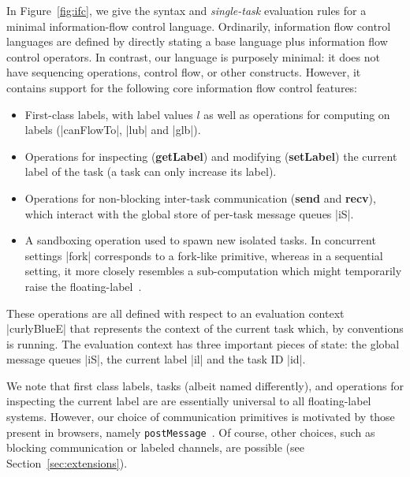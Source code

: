 In Figure~\ref{fig:ifc}, we give the syntax and \emph{single-task}
evaluation rules for a minimal information-flow control language.
Ordinarily, information flow control languages are defined by directly
stating a base language plus information flow control operators.  In
contrast, our language is purposely minimal: it does not have sequencing
operations, control flow, or other constructs.  However, it contains
support for the following core information flow control features:

\begin{itemize}
    \item First-class labels, with label values $l$ as well as operations for computing on
labels (|canFlowTo|, |lub| and |glb|).
    \item Operations for inspecting (\textbf{getLabel}) and modifying
    (\textbf{setLabel}) the current label of the task (a task can only increase its label).
    \item Operations for non-blocking inter-task communication (\textbf{send}
    and \textbf{recv}), which interact with the global store of per-task
    message queues |iS|.
    \item A sandboxing operation used to spawn new isolated tasks. In concurrent
      settings |fork| corresponds to a fork-like primitive, whereas in a
      sequential setting, it more closely resembles a sub-computation which might
      temporarily raise the floating-label~\cite{lio,Hritcu:2013:YIB:2497621.2498098}.
\end{itemize}

These operations are all defined with respect to an evaluation context
|curlyBlueE| that represents the context of the current task which, by
conventions is running. The evaluation context has three important pieces of
state: the global message queues |iS|, the current label |il| and the task ID |id|.

We note that first class labels, tasks (albeit named differently), and
operations for inspecting the current label are are essentially universal to
all floating-label systems.
%
However, our choice of communication primitives is motivated by
those present in browsers, namely \texttt{postMessage}~\cite{webmessaging}.
%
Of course, other choices, such as blocking communication or labeled channels,
are possible (see Section~\ref{sec:extensions}).
%

